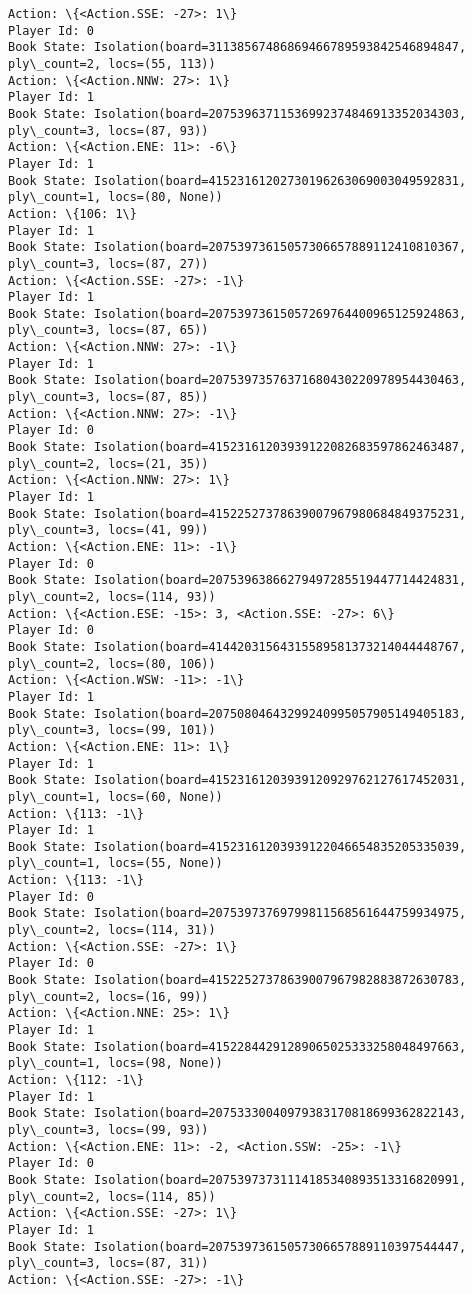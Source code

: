 \documentclass[11pt]{article}
\begin{document}
\begin{Verbatim}[commandchars=\\\{\}]
Action: \{<Action.SSE: -27>: 1\}
Player Id: 0
Book State: Isolation(board=31138567486869466789593842546894847, ply\_count=2, locs=(55, 113))
Action: \{<Action.NNW: 27>: 1\}
Player Id: 1
Book State: Isolation(board=20753963711536992374846913352034303, ply\_count=3, locs=(87, 93))
Action: \{<Action.ENE: 11>: -6\}
Player Id: 1
Book State: Isolation(board=41523161202730196263069003049592831, ply\_count=1, locs=(80, None))
Action: \{106: 1\}
Player Id: 1
Book State: Isolation(board=20753973615057306657889112410810367, ply\_count=3, locs=(87, 27))
Action: \{<Action.SSE: -27>: -1\}
Player Id: 1
Book State: Isolation(board=20753973615057269764400965125924863, ply\_count=3, locs=(87, 65))
Action: \{<Action.NNW: 27>: -1\}
Player Id: 1
Book State: Isolation(board=20753973576371680430220978954430463, ply\_count=3, locs=(87, 85))
Action: \{<Action.NNW: 27>: -1\}
Player Id: 0
Book State: Isolation(board=41523161203939122082683597862463487, ply\_count=2, locs=(21, 35))
Action: \{<Action.NNW: 27>: 1\}
Player Id: 1
Book State: Isolation(board=41522527378639007967980684849375231, ply\_count=3, locs=(41, 99))
Action: \{<Action.ENE: 11>: -1\}
Player Id: 0
Book State: Isolation(board=20753963866279497285519447714424831, ply\_count=2, locs=(114, 93))
Action: \{<Action.ESE: -15>: 3, <Action.SSE: -27>: 6\}
Player Id: 0
Book State: Isolation(board=41442031564315589581373214044448767, ply\_count=2, locs=(80, 106))
Action: \{<Action.WSW: -11>: -1\}
Player Id: 1
Book State: Isolation(board=20750804643299240995057905149405183, ply\_count=3, locs=(99, 101))
Action: \{<Action.ENE: 11>: 1\}
Player Id: 1
Book State: Isolation(board=41523161203939120929762127617452031, ply\_count=1, locs=(60, None))
Action: \{113: -1\}
Player Id: 1
Book State: Isolation(board=41523161203939122046654835205335039, ply\_count=1, locs=(55, None))
Action: \{113: -1\}
Player Id: 0
Book State: Isolation(board=20753973769799811568561644759934975, ply\_count=2, locs=(114, 31))
Action: \{<Action.SSE: -27>: 1\}
Player Id: 0
Book State: Isolation(board=41522527378639007967982883872630783, ply\_count=2, locs=(16, 99))
Action: \{<Action.NNE: 25>: 1\}
Player Id: 1
Book State: Isolation(board=41522844291289065025333258048497663, ply\_count=1, locs=(98, None))
Action: \{112: -1\}
Player Id: 1
Book State: Isolation(board=20753330040979383170818699362822143, ply\_count=3, locs=(99, 93))
Action: \{<Action.ENE: 11>: -2, <Action.SSW: -25>: -1\}
Player Id: 0
Book State: Isolation(board=20753973731114185340893513316820991, ply\_count=2, locs=(114, 85))
Action: \{<Action.SSE: -27>: 1\}
Player Id: 1
Book State: Isolation(board=20753973615057306657889110397544447, ply\_count=3, locs=(87, 31))
Action: \{<Action.SSE: -27>: -1\}


\end{Verbatim}
\end{document}
